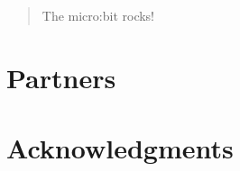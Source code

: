 \documentclass{research4cacm}
\begin{document}
\maketitle
\begin{abstract}

The micro:bit rocks!

\end{abstract}






\section{Partners}


\section{Acknowledgments}

%
\balancecolumns
\end{document}
